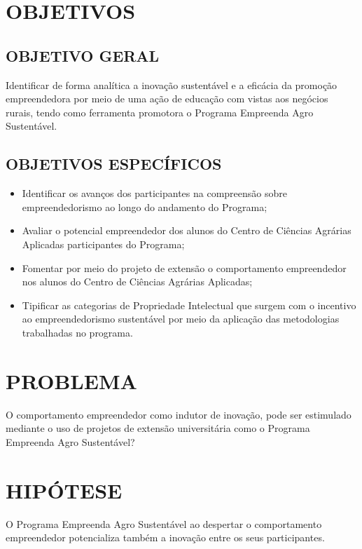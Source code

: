 \newpage

\section{OBJETIVOS}

\subsection{OBJETIVO GERAL}

Identificar de forma analítica a inovação sustentável e a eficácia da promoção empreendedora por meio de uma ação de educação com vistas aos negócios rurais, tendo como ferramenta promotora o Programa Empreenda Agro Sustentável.

\subsection{OBJETIVOS ESPECÍFICOS}

\begin{itemize}
\item{Identificar os avanços dos participantes na compreensão sobre empreendedorismo ao longo do andamento do Programa;}

\item {Avaliar o potencial empreendedor dos alunos do Centro de Ciências Agrárias Aplicadas participantes do Programa;}
\item {Fomentar por meio do projeto de extensão o comportamento empreendedor nos alunos do Centro de Ciências Agrárias Aplicadas;}
\item {Tipificar as categorias de Propriedade Intelectual que surgem com o incentivo ao empreendedorismo sustentável por meio da aplicação das metodologias trabalhadas no programa.}
\end{itemize}


\section{PROBLEMA}

O comportamento empreendedor como indutor de inovação, pode ser estimulado mediante o uso de projetos de extensão universitária como o Programa Empreenda Agro Sustentável? 


\section{HIPÓTESE}

O Programa Empreenda Agro Sustentável ao despertar o comportamento empreendedor potencializa também a inovação entre os seus participantes.



